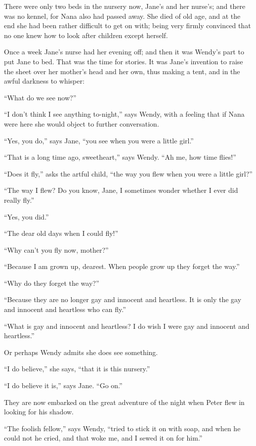 There were only two beds in the nursery now, Jane's and her nurse's;
and there was no kennel, for Nana also had passed away. She died of old
age, and at the end she had been rather difficult to get on with; being
very firmly convinced that no one knew how to look after children
except herself.

Once a week Jane's nurse had her evening off; and then it was Wendy's
part to put Jane to bed. That was the time for stories. It was Jane's
invention to raise the sheet over her mother's head and her own, thus
making a tent, and in the awful darkness to whisper:

``What do we see now?''

``I don't think I see anything to-night,'' says Wendy, with a feeling
that if Nana were here she would object to further conversation.

``Yes, you do,'' says Jane, ``you see when you were a little girl.''

``That is a long time ago, sweetheart,'' says Wendy. ``Ah me, how time
flies!''

``Does it fly,'' asks the artful child, ``the way you flew when you were a
little girl?''

``The way I flew? Do you know, Jane, I sometimes wonder whether I ever
did really fly.''

``Yes, you did.''

``The dear old days when I could fly!''

``Why can't you fly now, mother?''

``Because I am grown up, dearest. When people grow up they forget the
way.''

``Why do they forget the way?''

``Because they are no longer gay and innocent and heartless. It is only
the gay and innocent and heartless who can fly.''

``What is gay and innocent and heartless? I do wish I were gay and
innocent and heartless.''

Or perhaps Wendy admits she does see something.

``I do believe,'' she says, ``that it is this nursery.''

``I do believe it is,'' says Jane. ``Go on.''

They are now embarked on the great adventure of the night when Peter
flew in looking for his shadow.

``The foolish fellow,'' says Wendy, ``tried to stick it on with soap, and
when he could not he cried, and that woke me, and I sewed it on for
him.''

